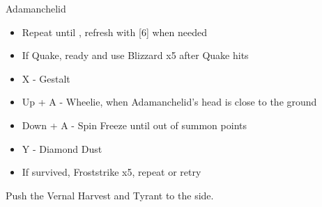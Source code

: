 \begin{multicols}{2}
\begin{battle}{Adamanchelid}
\begin{itemize}
\begin{itemize}
        \item Repeat until \stagger, refresh with [6] when needed
        \item If Quake, ready and use Blizzard x5 after Quake hits
        \item X - Gestalt
        \item Up + A - Wheelie, when Adamanchelid's head is close to the ground
        \item Down + A - Spin Freeze until out of summon points
        \item Y - Diamond Dust
        \item If survived, Froststrike x5, repeat or retry
    \end{itemize}
\end{itemize}
\end{battle}
\columnbreak
{}
Push the Vernal Harvest and Tyrant to the side.


\end{multicols}
